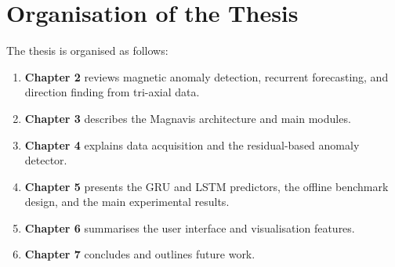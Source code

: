 \section{Organisation of the Thesis}
The thesis is organised as follows:
\begin{enumerate}[label=(\alph*)]
    \item \textbf{Chapter 2} reviews magnetic anomaly detection, recurrent forecasting, and direction finding from tri-axial data.
    \item \textbf{Chapter 3} describes the Magnavis architecture and main modules.
    \item \textbf{Chapter 4} explains data acquisition and the residual-based anomaly detector.
    \item \textbf{Chapter 5} presents the GRU and LSTM predictors, the offline benchmark design, and the main experimental results.
    \item \textbf{Chapter 6} summarises the user interface and visualisation features.
    \item \textbf{Chapter 7} concludes and outlines future work.
\end{enumerate}
